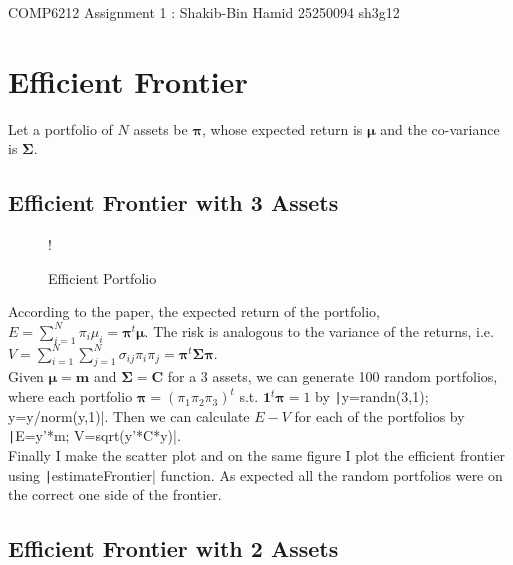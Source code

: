 \documentclass[11pt]{article}
\begin{document}
\begin{center}

COMP6212 Assignment 1 : Shakib-Bin Hamid 25250094 sh3g12

\end{center}

\section{Efficient Frontier}

Let a portfolio of $N$ assets be $\bm{\pi}$, whose expected return is $\bm{\mu}$ and the 
co-variance is $\bm{\Sigma}$. \\

\subsection{Efficient Frontier with 3 Assets}

\begin{figure}
	\vspace{-2cm}
  \begin{center}
     {!} { }
	\caption{Efficient Portfolio}
	\label{fig:q1-a-efficient-portfolio}
  \end{center}
	\vspace{-1cm}
\end{figure}

According to the paper, the expected return of the portfolio, 
$E = \sum_{i=1}^N\pi_i\mu_i = \bm{\pi}^t\bm{\mu}$. The risk is analogous to the variance of
the returns, i.e. $V = \sum_{i=1}^N\sum_{j=1}^N\sigma_{ij}\pi_i\pi_j = \bm{\pi}^t\bm{\Sigma}\bm{\pi}$.\\

Given $\bm{\mu} = \bm{m}$ and $\bm{\Sigma} = \bm{C}$ for a $3$ assets, we can generate 100 random
portfolios, where each portfolio $\bm{\pi} = (\pi_1 \pi_2 \pi_3)^t$ s.t. $\bm{1}^t\bm{\pi} = 1$ by
\texttt|y=randn(3,1); y=y/norm(y,1)|. Then we can calculate $E-V$ for each of the portfolios by
\texttt|E=y'*m; V=sqrt(y'*C*y)|.\\

Finally I make the scatter plot and on the same figure I plot the efficient frontier using
\texttt|estimateFrontier| function. As expected all the random portfolios were on the
correct one side of the frontier. 

\subsection{Efficient Frontier with 2 Assets}
\end{document}
